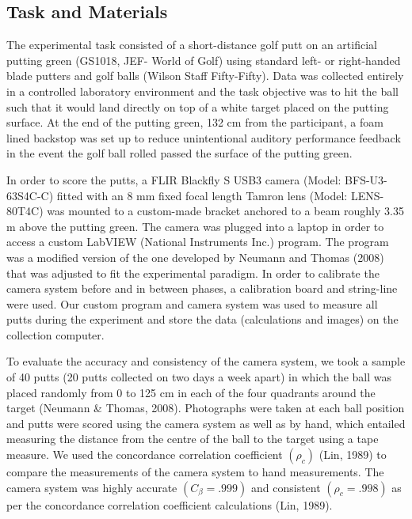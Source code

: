 \documentclass[
  english,
  man,floatsintext]{apa7}
\begin{document}
\hypertarget{task-and-materials}{%
\subsection{Task and Materials}\label{task-and-materials}}

The experimental task consisted of a short-distance golf putt on an artificial putting green (GS1018, JEF- World of Golf) using standard left- or right-handed blade putters and golf balls (Wilson Staff Fifty-Fifty). Data was collected entirely in a controlled laboratory environment and the task objective was to hit the ball such that it would land directly on top of a white target placed on the putting surface. At the end of the putting green, 132 cm from the participant, a foam lined backstop was set up to reduce unintentional auditory performance feedback in the event the golf ball rolled passed the surface of the putting green.

In order to score the putts, a FLIR Blackfly S USB3 camera (Model: BFS-U3-63S4C-C) fitted with an 8 mm fixed focal length Tamron lens (Model: LENS-80T4C) was mounted to a custom-made bracket anchored to a beam roughly 3.35 m above the putting green. The camera was plugged into a laptop in order to access a custom LabVIEW (National Instruments Inc.) program. The program was a modified version of the one developed by Neumann and Thomas (2008) that was adjusted to fit the experimental paradigm. In order to calibrate the camera system before and in between phases, a calibration board and string-line were used. Our custom program and camera system was used to measure all putts during the experiment and store the data (calculations and images) on the collection computer.

To evaluate the accuracy and consistency of the camera system, we took a sample of 40 putts (20 putts collected on two days a week apart) in which the ball was placed randomly from 0 to 125 cm in each of the four quadrants around the target (Neumann \& Thomas, 2008). Photographs were taken at each ball position and putts were scored using the camera system as well as by hand, which entailed measuring the distance from the centre of the ball to the target using a tape measure. We used the concordance correlation coefficient \((\rho_{c})\) (Lin, 1989) to compare the measurements of the camera system to hand measurements. The camera system was highly accurate \((C_{\beta} = .999)\) and consistent \((\rho_{c} = .998)\) as per the concordance correlation coefficient calculations (Lin, 1989).
\end{document}
